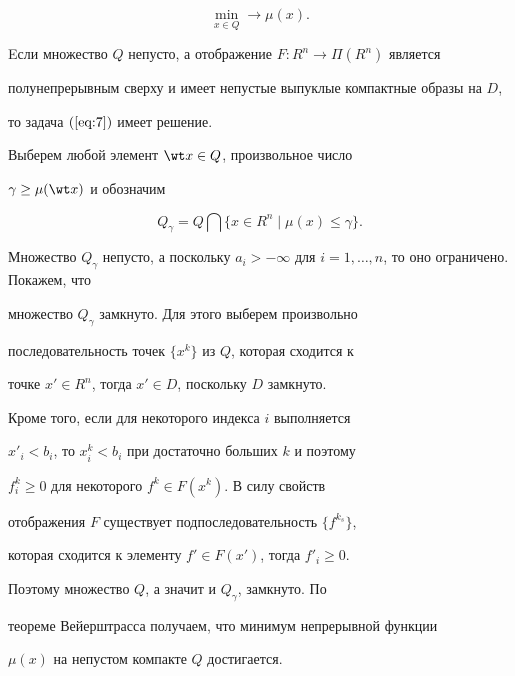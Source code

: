 \begin{equation}\label{eq:7}


\min\limits_{x \in Q} \to \mu(x).


\end{equation}











\begin{lems}\label{lem:2}


Eсли множество $Q$ непусто, а отображение $F: R^n \to \Pi (R^n)$ является


полунепрерывным сверху и имеет непустые выпуклые компактные образы на $D$, 


то задача $(\ref{eq:7})$ имеет решение.


\end{lems}








\begin{pf}


Выберем любой элемент $\wt x\in Q$, произвольное число


$\gamma \ge \mu(\wt x)$ и обозначим


$$


Q_{\gamma} = Q \bigcap \{x \in R^n \mid \mu(x) \le \gamma\}.


$$


Множество $Q_{\gamma}$ непусто, а поскольку $a_i >


-\infty$ для $i=1,\dotsc,n$, то оно ограничено. Покажем, что


множество $Q_{\gamma}$ замкнуто. Для этого выберем произвольно


последовательность точек $\{ x^k\}$ из $Q$, которая сходится к


точке $x' \in R^n$, тогда $x' \in D$, поскольку $D$ замкнуто.


Кроме того, если для некоторого индекса $i$ выполняется


$x'_i<b_i$, то $x^k_i <b_i$ при достаточно больших $k$ и поэтому


$f^k_i \ge 0$ для некоторого  $f^k \in F(x^k)$. В силу свойств


отображения $F$ существует подпоследовательность $\{f^{k_s}\}$,


которая сходится к элементу $f'\in F(x')$, тогда $f'_i \ge 0$.


Поэтому множество $Q$, а значит и $Q_{\gamma}$, замкнуто. По


теореме Вейерштрасса получаем, что минимум непрерывной функции


$\mu(x)$ на непустом компакте $Q$ достигается.


\end{pf}






